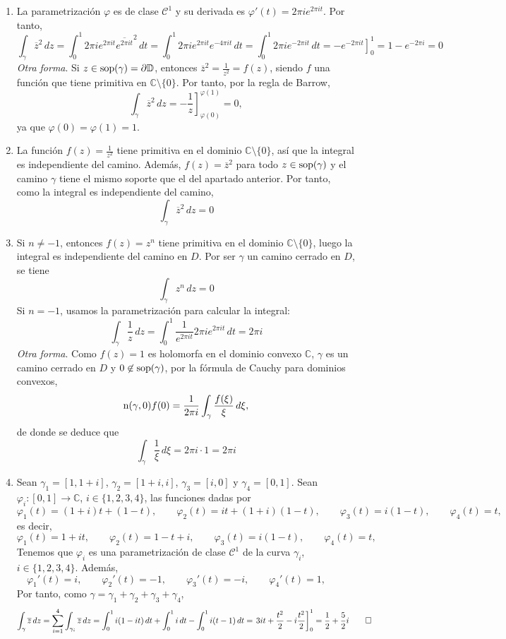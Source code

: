 \documentclass[11pt]{report}
\makeatletter
\renewenvironment{proof}[1][\proofname]{\par
  \pushQED{\qed}%
  \normalfont \topsep\z@skip %
  \trivlist
  \item[\hskip\labelsep
        \itshape
    #1\@addpunct{.}]\ignorespaces
}{%
  \popQED\endtrivlist\@endpefalse
}
\newcommand{\C}{\mathbb C}
\newcommand{\D}{\mathbb D}
\makeatother
\begin{document}
\begin{proof}
\hfill
\begin{enumerate}
    \item La parametrización $\varphi$ es de clase $\mathcal{C}^1$ y su derivada es $\varphi'(t) = 2\pi i e^{2\pi i t}$. Por tanto,
    \[\int_\gamma \overline{z}^2\, dz = \int_0^1 2\pi i e^{2\pi i t}\overline{e^{2\pi i t}}^2 \, dt = \int_0^1 2\pi ie^{2\pi i t}e^{-4\pi i t} \, dt = \int_0^1 2\pi i e^{-2\pi i t} \, dt = \left.-e^{-2\pi i t}\right]_0^1 = 1-e^{-2\pi i} = 0\]
    \emph{Otra forma}. Si $z \in \textup{sop}(\gamma) = \partial  \D$, entonces $\overline{z}^2 = \frac{1}{z^2} = f(z)$, siendo $f$ una función que tiene primitiva en $\C \setminus \{0\}$. Por tanto, por la regla de Barrow,
    \[\int_\gamma \overline{z}^2 \, dz = \left.-\frac{1}{z}\right]_{\varphi(0)}^{\varphi(1)} = 0,\]
    ya que $\varphi(0)=\varphi(1) = 1$.
    \item La función $f(z) = \frac{1}{z^2} $ tiene primitiva en el dominio $\C \setminus \{0\}$, así que la integral es independiente del camino. Además, $f(z)=\overline{z}^2$ para todo $z \in \textup{sop}(\gamma)$ y el camino $\gamma$ tiene el mismo soporte que el del apartado anterior. Por tanto, como la integral es independiente del camino,
    \[\int_\gamma \overline{z}^2\, dz = 0\]
    \item Si $n \neq -1$, entonces $f(z)=z^n$ tiene primitiva en el dominio $\C \setminus \{0\}$, luego la integral es independiente del camino en $D$. Por ser $\gamma$ un camino cerrado en $D$, se tiene
    \[\int_\gamma z^n \, dz = 0\]
    Si $n = -1$, usamos la parametrización para calcular la integral:
    \[\int_\gamma \frac{1}{z}\, dz = \int_0^1 \frac{1}{e^{2\pi i t}} 2\pi i e^{2\pi i t} \, dt = 2\pi i\]
    \emph{Otra forma}. Como $f(z)=1$ es holomorfa en el dominio convexo $\C$, $\gamma$ es un camino cerrado en $D$ y $0 \not\in \textup{sop}(\gamma)$, por la fórmula de Cauchy para dominios convexos,
    \[\textup{n}(\gamma,0)f(0)= \frac{1}{2\pi i}\int_\gamma \frac{f(\xi)}{\xi} \, d\xi, \]
    de donde se deduce que
    \[\int_\gamma \frac{1}{\xi} \, d\xi = 2\pi i \cdot 1 = 2\pi i\]
    \item Sean $\gamma_1 = [1,1+i]$, $\gamma_2 = [1+i,i]$, $\gamma_3 = [i,0]$ y $\gamma_4 = [0,1]$. Sean $\varphi_i\colon [0,1] \to \C$, $i\in\{1,2,3,4\}$, las funciones dadas por
    \[\varphi_1(t) = (1+i)t+(1-t), \qquad \varphi_2(t) = it+(1+i)(1-t), \qquad \varphi_3(t) = i(1-t), \qquad \varphi_4(t) = t,\]
    es decir,
    \[\varphi_1(t) = 1+it, \qquad \varphi_2(t) =1-t+i, \qquad \varphi_3(t) = i(1-t), \qquad \varphi_4(t) = t,\]
    Tenemos que $\varphi_i$ es una parametrización de clase $\mathcal{C}^1$ de la curva $\gamma_i$, $i \in \{1,2,3,4\}$. Además,
    \[\varphi_1'(t) = i, \qquad \varphi_2'(t) = -1, \qquad \varphi_3'(t) = -i, \qquad \varphi_4'(t) = 1, \qquad \]
    Por tanto, como $\gamma = \gamma_1+\gamma_2+\gamma_3+\gamma_4$,
    \[
        \int_\gamma \overline{z} \, dz = \sum_{i=1}^4 \int_{\gamma_i} \overline{z} \, dz = \int_0^1 i(1-it) \, dt +\int_0^1 i \, dt -\int_0^1 i(t-1) \, dt = \left.3it+\frac{t^2}{2}-i\frac{t^2}{2}\right]_0^1 =\frac{1}{2}+\frac{5}{2}i \qedhere\]
\end{enumerate}
\end{proof}
\end{document}
